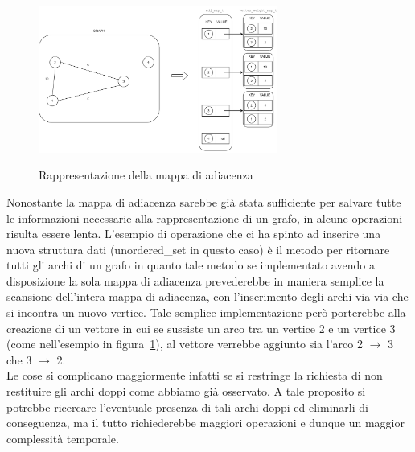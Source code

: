 \begin{figure}[h]
	\caption{Rappresentazione della mappa di adiacenza}
	\centering
	\includegraphics[width=0.7\textwidth]{./images/AdjMapGraphAbstract.png}
	\label{fig:AdjMapGraph Abstract}
\end{figure}

Nonostante la mappa di adiacenza sarebbe già stata sufficiente per salvare tutte le informazioni necessarie alla rappresentazione di un grafo, in alcune operazioni risulta essere lenta. L'esempio di operazione che ci ha spinto ad inserire una nuova struttura dati (unordered\_set in questo caso) è il metodo per ritornare tutti gli archi di un grafo in quanto tale metodo se implementato avendo a disposizione la sola mappa di adiacenza prevederebbe in maniera semplice la scansione dell'intera mappa di adiacenza, con l'inserimento degli archi via via che si incontra un nuovo vertice. Tale semplice implementazione però porterebbe alla creazione di un vettore in cui se sussiste un arco tra un vertice 2 e un vertice 3 (come nell'esempio in figura~\ref{fig:AdjMapGraph Abstract}), al vettore verrebbe aggiunto sia l'arco 2 $\rightarrow$ 3 che 3 $\rightarrow$ 2. \\

Le cose si complicano maggiormente infatti se si restringe la richiesta di non restituire gli archi doppi come abbiamo già osservato. A tale proposito si potrebbe ricercare l'eventuale presenza di tali archi doppi ed eliminarli di conseguenza, ma il tutto richiederebbe maggiori operazioni e dunque un maggior complessità temporale.\\

